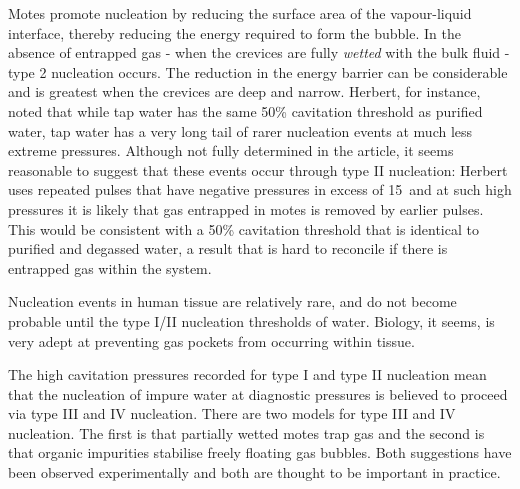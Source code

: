 Motes %
promote nucleation by reducing the surface area of the vapour-liquid interface,
thereby reducing the energy required to form the bubble.
In the absence of entrapped gas - when the crevices are fully {\em wetted} with the bulk fluid -  type 2 nucleation occurs.
The reduction in the energy barrier can be considerable and is greatest when the crevices are deep and narrow\cite{Lubetkin1995}.
Herbert\cite{Herbert2006}, for instance, noted that while tap water has the same 50\% cavitation threshold as purified water,
%
%
tap water has a very long tail of rarer nucleation events at much less extreme pressures.
Although not fully determined in the article, 
it seems reasonable to suggest that these events occur through type II nucleation:
Herbert uses repeated pulses that have negative pressures in excess of \unit{15}\mega\pascal\
and at such high pressures it is likely that gas entrapped in motes is removed 
by earlier pulses.
This would be consistent with a 50\% cavitation threshold that is identical to purified and degassed water,
a result that is hard to reconcile if there is entrapped gas within the system.

Nucleation events in human tissue are relatively rare,
%
and do not become probable until the type I/II nucleation thresholds of water\cite{}.
Biology, it seems, is very adept at preventing gas pockets from occurring within tissue.




The high cavitation pressures recorded for type I and type II nucleation 
mean that the nucleation of impure water at diagnostic pressures is believed to proceed via type III and IV nucleation\cite{Atchley1989, Borkent2009, Jones1999}.
There are two models for type III and IV nucleation. 
The first is that  partially wetted motes trap gas\cite{Atchley1989} and  the second is 
that  organic impurities  stabilise freely floating gas bubbles\cite{Yount1979}.
Both suggestions have been observed experimentally\cite{Borkent2009, Johnson1981}
and both are thought to be important in practice.

